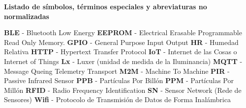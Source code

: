 \renewcommand{\thepage}{\Roman{page}}
    \textbf{\Large Listado de símbolos, términos especiales y abreviaturas no normalizadas}\newline

    \textbf{BLE} - Bluetooth Low Energy
    \newline
    \textbf{EEPROM} - Electrical Erasable Programmable Read Only Memory.
    \newline
    \textbf{GPIO} - General Purpose Input Output
    \newline
    \textbf{HR} - Humedad Relativa
    \newline
    \textbf{HTTP} - Hypertext Transfer Protocol
    \newline
    \textbf{IoT} - Internet de las Cosas o Internet of Things
    \newline
    \textbf{Lx} - Luxer (unidad de medida de la Iluminancia)
    \newline
    \textbf{MQTT} - Message Queing Telemetry Transport
    \newline
    \textbf{M2M} - Machine To Machine
    \newline
    \textbf{PIR} - Passive Infrared Sensor
    \newline
    \textbf{PPB} - Partículas Por Billón
    \newline
    \textbf{PPM} - Partículas Por Millón
    \newline
    \textbf{RFID} - Radio Frequency Identification
    \newline
    \textbf{SN} - Sensor Network (Rede de Sensores)
    \newline
    \textbf{Wifi} - Protocolo de Transmisión de Datos de Forma Inalámbrica
    
    
    
    
    
    
    
    \setcounter{page}{1}
    \thispagestyle{plain}
